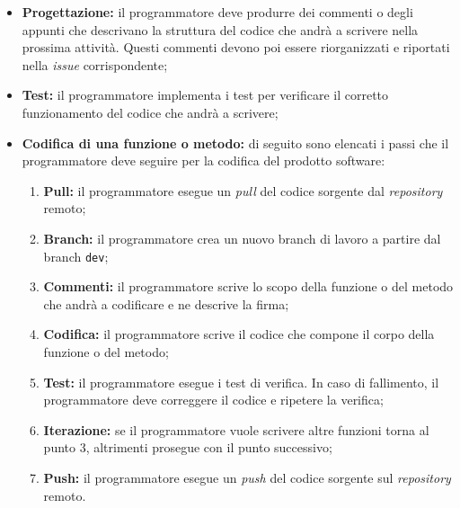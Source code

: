 \begin{itemize}
	\item \textbf{Progettazione:} il programmatore deve produrre dei commenti o
	      degli appunti che descrivano la struttura del codice che andrà a
	      scrivere nella prossima attività. Questi commenti devono poi essere
	      riorganizzati e riportati nella \textit{issue\g} corrispondente;

	\item \textbf{Test:} il programmatore implementa i test per verificare
	      il corretto funzionamento del codice che andrà a scrivere;

	\item \textbf{Codifica di una funzione o metodo:} di seguito sono elencati i
	      passi che il programmatore deve seguire per la codifica del prodotto
	      software:
	      \begin{enumerate}
		      \item \textbf{Pull:} il programmatore esegue un \textit{pull} del
		            codice sorgente dal \textit{repository\g} remoto;

		      \item \textbf{Branch:} il programmatore crea un nuovo branch di
		            lavoro a partire dal branch \texttt{dev};

		      \item \textbf{Commenti:} il programmatore scrive lo scopo della
		            funzione o del metodo che andrà a codificare e ne descrive
		            la firma;

		      \item \textbf{Codifica:} il programmatore scrive il codice che
		            compone il corpo della funzione o del metodo;

		      \item \textbf{Test:} il programmatore esegue i test di verifica.
		            In caso di fallimento, il programmatore deve correggere il
		            codice e ripetere la verifica;

		      \item \textbf{Iterazione:} se il programmatore vuole scrivere
		            altre funzioni torna al punto 3, altrimenti prosegue
		            con il punto successivo;

		      \item \textbf{Push:} il programmatore esegue un \textit{push}
		            del codice sorgente sul \textit{repository\g} remoto.


\end{enumerate}
\end{itemize}
